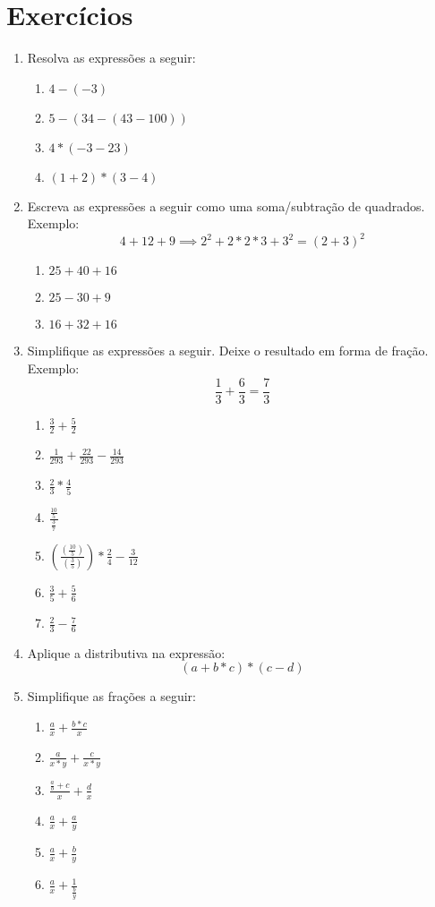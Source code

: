 \documentclass[11pt]{article}
\begin{document}
\section{Exercícios}
\begin{enumerate}
	\item Resolva as expressões a seguir:
	\begin{enumerate}
		\item $4 - (-3)$
		\item $5 - (34 - (43 - 100))$ 
		\item $4 * (-3 -23)$
		\item $(1 + 2)*(3-4)$
	\end{enumerate}

	\item Escreva as expressões a seguir como uma soma/subtração de quadrados.
	Exemplo:
	$$4 + 12 + 9 \implies 2^2 + 2*2*3 + 3^2 = {(2+3)}^2$$
	\begin{enumerate}
		\item $25 + 40 + 16$
		\item $25 - 30 + 9$
		\item $16 + 32 + 16$
	\end{enumerate}

	\item Simplifique as expressões a seguir.
	Deixe o resultado em forma de fração. Exemplo:
	$$\frac{1}{3} + \frac{6}{3} = \frac{7}{3}$$
	\begin{enumerate}
		\item $\frac{3}{2} + \frac{5}{2}$	
		\item $\frac{1}{293} + \frac{22}{293} - \frac{14}{293}$
		\item $\frac{2}{3} * \frac{4}{5}$
		\item $\frac{\frac{10}{5}}{\frac{3}{7}}$
		\item $(\frac{(\frac{10}{5})}{(\frac{3}{5})}) * 
		\frac{2}{4} - \frac{3}{12}$
		\item $\frac{3}{5} + \frac{5}{6}$
		\item $\frac{2}{3} - \frac{7}{6}$
	\end{enumerate}

	\item Aplique a distributiva na expressão:
	$$(a + b*c)*(c - d)$$

	\item Simplifique as frações a seguir:
	\begin{enumerate}
		\item $\frac{a}{x} + \frac{b*c}{x}$
		\item $\frac{a}{x*y} + \frac{c}{x*y}$
		\item $\frac{\frac{a}{b} + c}{x} + \frac{d}{x}$
		\item $\frac{a}{x} + \frac{a}{y}$
		\item $\frac{a}{x} + \frac{b}{y}$
		\item $\frac{a}{x} + \frac{1}{\frac{b}{y}}$
	\end{enumerate}


\end{enumerate}
\end{document}
